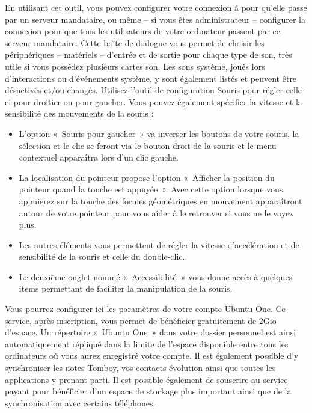 En utilisant cet outil, vous pouvez configurer votre connexion à  pour qu'elle passe par un serveur mandataire, ou même -- si vous êtes administrateur -- configurer la connexion pour que tous les utilisateurs de votre ordinateur passent par ce serveur mandataire.
Cette boîte de dialogue vous permet de choisir les périphériques -- matériels -- d'entrée et de sortie pour chaque type de son, très utile si vous possédez plusieurs cartes son. Les sons système, joués lors d'interactions ou d'événements système, y sont également listés et peuvent être désactivés et/ou changés.
Utilisez l'outil de configuration Souris pour régler celle-ci pour droitier ou pour gaucher. Vous pouvez également spécifier la vitesse et la sensibilité des mouvements de la souris :
\begin{itemize}
\item L'option «~Souris pour gaucher~» va inverser les boutons de votre souris, la sélection et le clic se feront via le bouton droit de la souris et le menu contextuel apparaîtra lors d'un clic gauche.
\item La localisation du pointeur propose l'option «~Afficher la position du pointeur quand la touche  est appuyée~». Avec cette option lorsque vous appuierez sur la touche  des formes géométriques en mouvement apparaîtront autour de votre pointeur pour vous aider à le retrouver si vous ne le voyez plus.
\item Les autres éléments vous permettent de régler la vitesse d'accélération et de sensibilité de la souris et celle du double-clic.
\item Le deuxième onglet nommé «~Accessibilité~» vous donne accès à quelques items permettant de faciliter la manipulation de la souris.
\end{itemize}
Vous pourrez configurer ici les paramètres de votre compte Ubuntu One. Ce service, après inscription, vous permet de bénéficier gratuitement de 2Gio d'espace. Un répertoire «~Ubuntu One~» dans votre dossier personnel est ainsi automatiquement répliqué dans la limite de l'espace disponible entre tous les ordinateurs où vous aurez enregistré votre compte. Il est également possible d'y synchroniser les notes Tomboy, vos contacts évolution ainsi que toutes les applications y prenant parti. Il est possible également de souscrire au service payant pour bénéficier d'un espace de stockage plus important ainsi que de la synchronisation avec certains téléphones.
